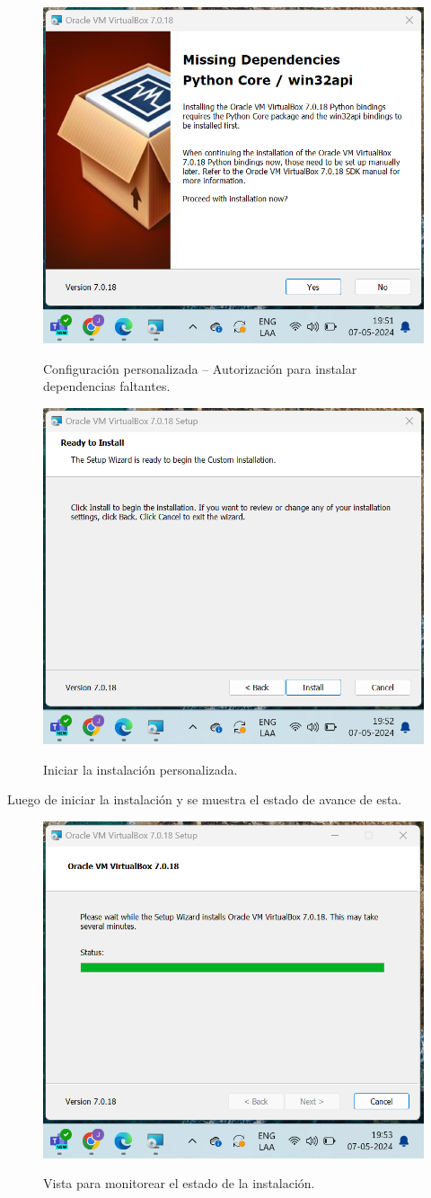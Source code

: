 \documentclass[stu, 11pt, letterpaper, donotrepeattitle, floatsintext, natbib]{apa7}
\begin{document}
 \hfill \break
\begin{figure}[H]
    \centering
    \caption{Configuración personalizada – Autorización para instalar dependencias faltantes.}
    \includegraphics[width=0.5\linewidth]{imagenCap2/5.png} %
    \label{fig:OverallEffect}
\end{figure}
\begin{figure}[H]
    \centering
    \caption{Iniciar la instalación personalizada.}
    \includegraphics[width=0.5\linewidth]{imagenCap2/6.png} %
    \label{fig:OverallEffect}
\end{figure}

Luego de iniciar la instalación y se muestra el estado de avance de esta.
\begin{figure}[H]
    \centering
    \caption{Vista para monitorear el estado de la instalación.}
    \includegraphics[width=0.5\linewidth]{imagenCap2/7.png} %
    \label{fig:OverallEffect}
\end{figure}
\end{document}
